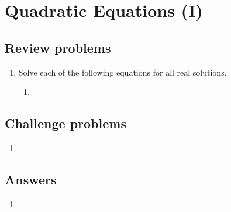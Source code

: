 \section{Quadratic Equations (I)}

\subsection{Review problems}

\begin{enumerate}
\item Solve each of the following equations for all real solutions.
\begin{enumerate}
\item 
\end{enumerate}
\end{enumerate}


\subsection{Challenge problems}

\begin{enumerate}[resume]
\item 
\end{enumerate}


\subsection{Answers}

\begin{enumerate}
\item 
\end{enumerate}